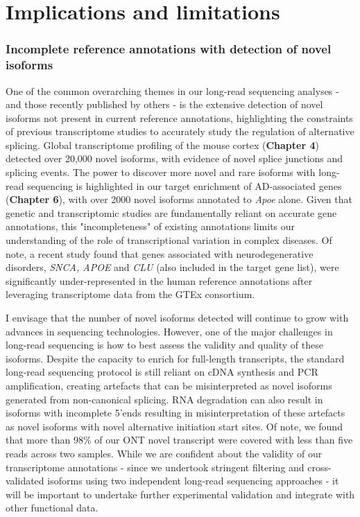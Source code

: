 \section{Implications and limitations}

\subsubsection{Incomplete reference annotations with detection of novel isoforms} 
One of the common overarching themes in our long-read sequencing analyses - and those recently published by others - is the extensive detection of novel isoforms not present in current reference annotations, highlighting the constraints of previous transcriptome studies to accurately study the regulation of alternative splicing. Global transcriptome profiling of the mouse cortex (\textbf{Chapter 4}) detected over 20,000 novel isoforms, with evidence of novel splice junctions and splicing events. The power to discover more novel and rare isoforms with long-read sequencing is highlighted in our target enrichment of AD-associated genes (\textbf{Chapter 6}), with over 2000 novel isoforms annotated to \textit{Apoe} alone. Given that genetic and transcriptomic studies are fundamentally reliant on accurate gene annotations, this "incompleteness" of existing annotations limits our understanding of the role of transcriptional variation in complex diseases. Of note, a recent study found that genes associated with neurodegenerative disorders, \textit{SNCA, APOE} and \textit{CLU} (also included in the target gene list), were significantly under-represented in the human reference annotations after leveraging transcriptome data from the GTEx consortium\cite{Zhang2020b}.  

I envisage that the number of novel isoforms detected will continue to grow with advances in sequencing technologies. However, one of the major challenges in long-read sequencing is how to best assess the validity and quality of these isoforms. Despite the capacity to enrich for full-length transcripts, the standard long-read sequencing protocol is still reliant on cDNA synthesis and PCR amplification, creating artefacts that can be misinterpreted as novel isoforms generated from non-canonical splicing. RNA degradation can also result in isoforms with incomplete 5'ends resulting in misinterpretation of these artefacts as novel isoforms with novel alternative initiation start sites\cite{Kuo2020}. Of note, we found that more than 98\% of our ONT novel transcript were covered with less than five reads across two samples. While we are confident about the validity of our transcriptome annotations - since we undertook stringent filtering and cross-validated isoforms using two independent long-read sequencing approaches - it will be important to undertake further experimental validation and integrate with other functional data. 

